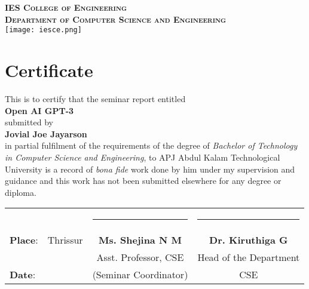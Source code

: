 \newpage
\thispagestyle{plain}
\vspace*{\fill}
\begin{center}
    \textbf{\textsc{IES College of Engineering}}\\[0.5cm]
    \textbf{\textsc{Department of Computer Science and Engineering}}\\[1cm]
    \texttt{[image: iesce.png]}
    \section*{Certificate}
    This is to certify that the seminar report entitled \\[0.3cm] \textbf{\large Open AI GPT-3} \\[0.3cm] submitted by \\[0.3cm] \textbf{Jovial Joe Jayarson} \\[0.3cm] in partial fulfilment of the requirements of the degree of \emph{Bachelor of Technology in Computer Science and Engineering}, to APJ Abdul Kalam Technological University is a record of \emph{bona fide}  work done by him under my supervision and guidance and this work has not been submitted elsewhere for any degree or diploma. \\[2cm]
\end{center}

\begin{table}[h]
    \centering
    \begin{tabular}{ l l c c }
                        &          & \rule{4.5cm}{0.15mm}     & \rule{4.5cm}{0.15mm}     \\
        \textbf{Place}: & Thrissur & \textbf{Ms. Shejina N M} & \textbf{Dr. Kiruthiga G} \\
                        &          & Asst. Professor, CSE     & Head of the Department   \\
        \textbf{Date}:  &          & (Seminar Coordinator)    & CSE                      \\
    \end{tabular}
\end{table}
\vspace*{\fill}